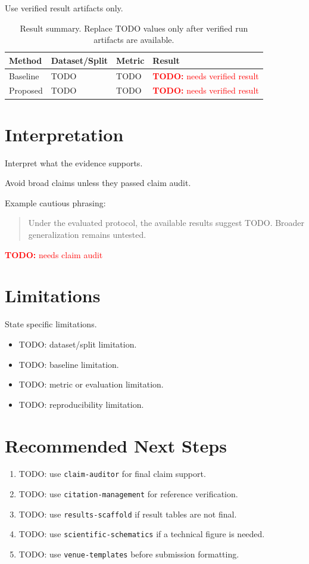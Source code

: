 \documentclass[11pt]{article}
\newcommand{\todo}[1]{\textcolor{red}{\textbf{TODO:} #1}}
\newcommand{\needresult}{\todo{needs verified result}}
\newcommand{\needclaimaudit}{\todo{needs claim audit}}
\begin{document}
Use verified result artifacts only.

\begin{table}[h]
\centering
\caption{Result summary. Replace TODO values only after verified run artifacts are available.}
\begin{tabular}{llll}
\toprule
Method & Dataset/Split & Metric & Result \\
\midrule
Baseline & TODO & TODO & \needresult \\
Proposed & TODO & TODO & \needresult \\
\bottomrule
\end{tabular}
\end{table}

\section{Interpretation}

Interpret what the evidence supports.

Avoid broad claims unless they passed claim audit.

Example cautious phrasing:

\begin{quote}
Under the evaluated protocol, the available results suggest TODO. Broader generalization remains untested.
\end{quote}

\needclaimaudit

\section{Limitations}

State specific limitations.

\begin{itemize}[leftmargin=*]
    \item TODO: dataset/split limitation.
    \item TODO: baseline limitation.
    \item TODO: metric or evaluation limitation.
    \item TODO: reproducibility limitation.
\end{itemize}

\section{Recommended Next Steps}

\begin{enumerate}[leftmargin=*]
    \item TODO: use \texttt{claim-auditor} for final claim support.
    \item TODO: use \texttt{citation-management} for reference verification.
    \item TODO: use \texttt{results-scaffold} if result tables are not final.
    \item TODO: use \texttt{scientific-schematics} if a technical figure is needed.
    \item TODO: use \texttt{venue-templates} before submission formatting.
\end{enumerate}
\end{document}
